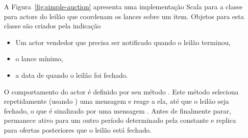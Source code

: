A Figura~\ref{fig:simple-auction} apresenta uma implementa\c{c}\~{a}o Scala para a classe
 para actors do leil\~{a}o que coordenam os lances sobre um item. Objetos
para esta classe s\~{a}o criados pela indica\c{c}\~{a}o
\begin{itemize}
\item Um actor vendedor que precisa ser notificado quando o leil\~{a}o terminou,
\item o lance m\'{i}nimo,
\item a data de quando o leil\~{a}o foi fechado.
\end{itemize}  
O comportamento do actor \'{e} definido por seu m\'{e}todo . Este m\'{e}todo seleciona
repetidamente (usando ) uma mensagem e reage a ela, at\'{e} que o 
leil\~{a}o seja fechado, o que \'{e} sinalizado por uma mensagem . Antes de 
finalmente parar, permanece ativo para um outro per\'{i}odo determinado pela constante 
 e replica para ofertas posteriores que o leil\~{a}o est\'{a} fechado.    


